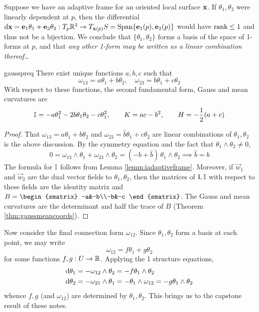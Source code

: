 
Suppose we have an adaptive frame for an oriented local surface ${\mathbf{x}}$. If $\theta_1,\theta_2$ were linearly dependent at $p$, then the differential $\mathrm{d}{\mathbf{x}}={\mathbf{e}}_1\theta_1+{\mathbf{e}}_2\theta_2:T_p\mathbb{R}^2\to T_{{\mathbf{x}}(p)}S=\operatorname{Span}\{{\mathbf{e}}_1(p),{\mathbf{e}}_2(p)\}$ would have $\operatorname{rank}\le 1$ and thus not be a bijection. We conclude that $\{\theta_1,\theta_2\}$ forms a basis of the space of 1-forms at $p$, and that \emph{any other 1-form may be written as a linear combination thereof\ldots}

\begin{lemm}{}{gausspreq}
	There exist unique functions $a,b,c$ such that
	\[
		\omega_{13}=a\theta_1+b\theta_2,\quad\omega_{23}=b\theta_1+c\theta_2
	\]
	With respect to these functions, the second fundamental form, Gauss and mean curvatures are
	\[
		\mathbb{I}=-a\theta_1^2-2b\theta_1\theta_2-c\theta_1^2,\qquad K=ac-b^2,\qquad H=-\frac 12(a+c)
	\]
\end{lemm}

\begin{proof}
	That $\omega_{13}=a\theta_1+b\theta_2$ and $\omega_{23}=\hat b\theta_1+c\theta_2$ are linear combinations of $\theta_1,\theta_2$ is the above discussion. By the symmetry equation and the fact that $\theta_1\wedge\theta_2\neq 0$,
	\[
		0=\omega_{13}\wedge\theta_1+\omega_{23}\wedge\theta_2=(-b+\hat b)\,\theta_1\wedge\theta_2 \implies \hat b=b
	\]
	The formula for $\mathbb{I}$ follows from Lemma \ref{lemm:iadaptiveframe}.
	\smallbreak
	Moreover, if $\vec w_1$ and $\vec w_2$ are the dual vector fields to $\theta_1,\theta_2$, then the matrices of $\mathrm{I},\mathbb{I}$ with respect to these fields are the identity matrix\footnotemark{} and $B=
	\begin{smatrix}
		-a&-b\\-b&-c
	\end{smatrix}$. The Gauss and mean curvatures are the determinant and half the trace of $B$ (Theorem \ref{thm:gaussmeancoords}).
\end{proof}


Now consider the final connection form $\omega_{12}$. Since $\theta_1,\theta_2$ form a basis at each point, we may write
\[
	\omega_{12}=f\theta_1+g\theta_2
\]
for some functions $f,g:U\to\mathbb{R}$. Applying the 1\st{} structure equations, 
\begin{align*}
	&\mathrm{d}\theta_1=-\omega_{12}\wedge\theta_2=-f\theta_1\wedge\theta_2\\
	&\mathrm{d}\theta_2=-\omega_{21}\wedge\theta_1=-\theta_1\wedge\omega_{12}=-g\theta_1\wedge\theta_2
\end{align*}
whence $f,g$ (and $\omega_{12}$) are determined by $\theta_1,\theta_2$. This brings us to the capstone result of these notes.

